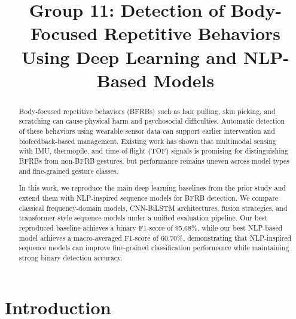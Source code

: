 \documentclass[conference]{IEEEtran}
\begin{document}
\title{Group 11: Detection of Body-Focused Repetitive Behaviors Using Deep Learning and NLP-Based Models}

\author{
}

\maketitle

\begin{abstract}

Body-focused repetitive behaviors (BFRBs) such as hair pulling, skin picking, and scratching can cause physical harm and psychosocial difficulties. Automatic detection of these behaviors using wearable sensor data can support earlier intervention and biofeedback-based management. Existing work has shown that multimodal sensing with IMU, thermopile, and time-of-flight (TOF) signals is promising for distinguishing BFRBs from non-BFRB gestures, but performance remains uneven across model types and fine-grained gesture classes.

In this work, we reproduce the main deep learning baselines from the prior study and extend them with NLP-inspired sequence models for BFRB detection. We compare classical frequency-domain models, CNN-BiLSTM architectures, fusion strategies, and transformer-style sequence models under a unified evaluation pipeline. Our best reproduced baseline achieves a binary F1-score of 95.68\%, while our best NLP-based model achieves a macro-averaged F1-score of 60.70\%, demonstrating that NLP-inspired sequence models can improve fine-grained classification performance while maintaining strong binary detection accuracy.
\end{abstract}

\clearpage

\section{Introduction}
\end{document}
